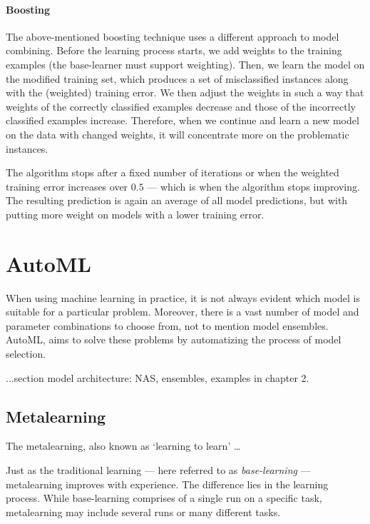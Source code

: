 \paragraph{Boosting} \label{boosting}
The above-mentioned boosting technique uses a different approach to model
combining. Before the learning process starts, we add weights to the training 
examples (the base-learner must support weighting). Then, we learn the model
on the modified training set, which produces a set of misclassified instances
along with the (weighted) training error. We then adjust the weights in such a
way that weights of the correctly classified examples decrease and those of
the incorrectly classified examples increase. Therefore, when we continue and
learn a new model on the data with changed weights, it will concentrate more 
on the problematic instances.

The algorithm stops after a fixed number of iterations or when the weighted
training error increases over $0.5$ --- which is when the algorithm stops
improving. The resulting prediction is again an average of all model
predictions, but with putting more weight on models with a lower training
error. \citep[335]{Flach:2012:MLA:2490546}

\section{AutoML}
When using machine learning in practice, it is not always evident which model
is suitable for a particular problem. Moreover, there is a vast number of model
and parameter combinations to choose from, not to mention model ensembles. 
AutoML, aims to solve these problems by automatizing the process of model 
selection.


...section model architecture: NAS, ensembles, examples in chapter 2.

\subsection{Metalearning}
The metalearning, also known as `learning to learn' \ldots

Just as the traditional learning --- here referred to as \emph{base-learning}
--- metalearning improves with experience. The difference lies in the learning
process. While base-learning comprises of a single run on a specific task,
metalearning may include several runs or many different tasks.

